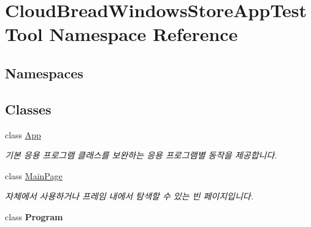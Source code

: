 \hypertarget{namespace_cloud_bread_windows_store_app_test_tool}{}\section{Cloud\+Bread\+Windows\+Store\+App\+Test\+Tool Namespace Reference}
\label{namespace_cloud_bread_windows_store_app_test_tool}
\subsection*{Namespaces}
\begin{DoxyCompactItemize}
\end{DoxyCompactItemize}
\subsection*{Classes}
\begin{DoxyCompactItemize}
\item 
class \hyperlink{class_cloud_bread_windows_store_app_test_tool_1_1_app}{App}
\begin{DoxyCompactList}\small\item\em 기본 응용 프로그램 클래스를 보완하는 응용 프로그램별 동작을 제공합니다. \end{DoxyCompactList}\item 
class \hyperlink{class_cloud_bread_windows_store_app_test_tool_1_1_main_page}{Main\+Page}
\begin{DoxyCompactList}\small\item\em 자체에서 사용하거나 프레임 내에서 탐색할 수 있는 빈 페이지입니다. \end{DoxyCompactList}\item 
class {\bfseries Program}
\end{DoxyCompactItemize}
